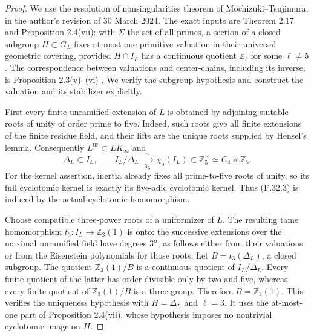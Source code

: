 \begin{proof}
We use the resolution of nonsingularities theorem
of Mochizuki--Tsujimura, in the author's revision
of 30 March 2024.  The exact inputs are
Theorem 2.17 and Proposition 2.4(vii):
with $\Sigma$ the set of all primes, a section
of a closed subgroup $H\subset G_L$ fixes at most
one primitive valuation in their universal
geometric covering, provided $H\cap I_L$ has a
continuous quotient $\mathbb Z_\ell$ for some
$\ell\ne5$.  The correspondence between valuations
and center-chains, including its inverse, is
Proposition 2.3(v)--(vi)
\cite[Propositions 2.3(v)--(vi), 2.4(vii);
Theorem 2.17]{BC_MochizukiTsujimura2024}.
We verify the subgroup hypothesis and construct
the valuation and its stabilizer explicitly.

First every finite unramified extension of $L$
is obtained by adjoining suitable roots of unity
of order prime to five.  Indeed, such roots
give all finite extensions of the finite residue
field, and their lifts are the unique roots
supplied by Hensel's lemma.
Consequently $L^{\mathrm{ur}}\subset LK_\infty$
and
\[
 \Delta_L\subset I_L,\qquad
 I_L/\Delta_L
   \ \xrightarrow[\ \chi_5\ ]{\ \sim\ }\
 \chi_5(I_L)\subset\mathbb Z_5^\times
                 \simeq C_4\times\mathbb Z_5.             \tag{F.32.3}
\]
For the kernel assertion, inertia already fixes
all prime-to-five roots of unity, so its full
cyclotomic kernel is exactly its five-adic
cyclotomic kernel.  Thus (F.32.3) is induced by
the actual cyclotomic homomorphism.

Choose compatible three-power roots of a
uniformizer of $L$.  The resulting tame
homomorphism $t_3:I_L\to\mathbb Z_3(1)$ is onto:
the successive extensions over the maximal
unramified field have degrees $3^n$, as follows
either from their valuations or from the
Eisenstein polynomials for those roots.
Let $B=t_3(\Delta_L)$, a closed subgroup.
The quotient $\mathbb Z_3(1)/B$ is a continuous
quotient of $I_L/\Delta_L$.
Every finite quotient of the latter has order
divisible only by two and five, whereas every
finite quotient of $\mathbb Z_3(1)/B$ is a
three-group.  Therefore $B=\mathbb Z_3(1)$.
This verifies the uniqueness hypothesis with
$H=\Delta_L$ and $\ell=3$.
It uses the at-most-one part of Proposition
2.4(vii), whose hypothesis imposes no nontrivial
cyclotomic image on $H$.


\end{proof}
